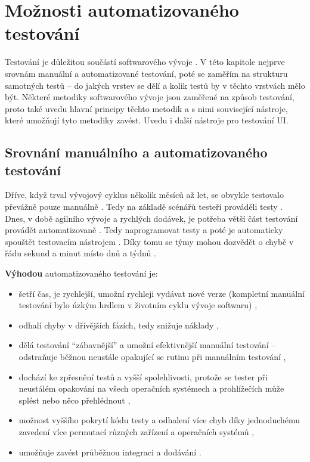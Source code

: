 \chapter{Možnosti automatizovaného testování}

Testování je důležitou součástí softwarového vývoje \cite{test-bdo}. V této kapitole nejprve srovnám manuální a automatizované testování, poté se zaměřím na strukturu samotných testů -- do jakých vrstev se dělí a kolik testů by v těchto vrstvách mělo být. Některé metodiky softwarového vývoje jsou zaměřené na způsob testování, proto také uvedu hlavní principy těchto metodik a s nimi související nástroje, které umožňují tyto metodiky zavést. Uvedu i další nástroje pro testování UI.

\section{Srovnání manuálního a automatizovaného testování}
Dříve, když trval vývojový cyklus několik měsíců až let, se obvykle testovalo převážně pouze manuálně \cite{test-kitner}. Tedy na základě scénářů testeři prováděli testy \cite{test-bdo}. Dnes, v době agilního vývoje a rychlých dodávek, je potřeba větší část testování provádět automatizovaně \cite{test-kitner}. Tedy naprogramovat testy a poté je automaticky spouštět testovacím nástrojem \cite{test-bdo}. Díky tomu se týmy mohou dozvědět o chybě v řádu sekund a minut místo dnů a týdnů \cite{test-fowler}.

\textbf{Výhodou} automatizovaného testování je:
\begin{itemize}
    \item šetří čas, je rychlejší, umožní rychleji vydávat nové verze (kompletní manuální testování bylo úzkým hrdlem v životním cyklu vývoje softwaru) \cite{test-kitner, test-genez, test-cd},
    \item odhalí chyby v dřívějších fázích, tedy snižuje náklady \cite{test-kitner},
    \item dělá testování \enquote{zábavnější} a umožní efektivnější manuální testování -- odstraňuje běžnou neustále opakující se rutinu při manuálním testování \cite{test-kitner, test-perfecto},
    \item dochází ke zpřesnění testů a vyšší spolehlivosti, protože se tester při neustálém opakování na všech operačních systémech a prohlížečích může splést nebo něco přehlédnout \cite{test-kitner, test-genez},
    \item možnost vyššího pokrytí kódu testy a odhalení více chyb díky jednoduchému zavedení více permutací různých zařízení a operačních systémů \cite{test-perfecto},
    \item umožňuje zavést průběžnou integraci a dodávání \cite{test-kitner2}.
\end{itemize}

